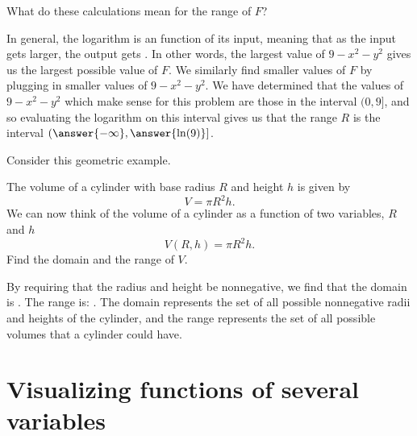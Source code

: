 \documentclass{ximera}
\begin{document}
\begin{question}
\begin{question}
\begin{question}
\begin{prompt}
        What do these calculations mean for the range of $F$? 
        
       
        In general, the logarithm is an
        function of its input, meaning that as the input gets larger,
        the output gets
        .  In
        other words, the largest value of $9-x^2-y^2$ gives us the
        largest possible value of $F$.  We similarly find smaller
        values of $F$ by plugging in smaller values of $9-x^2-y^2$.
        We have determined that the values of $9-x^2-y^2$ which make
        sense for this problem are those in the interval $(0, 9]$, and
  so evaluating the logarithm on this interval gives us that the range
  $R$ is the interval $\left(\answer{-\infty},\answer{\ln(9)}\right]$.
      \end{prompt}
    \end{question}
  \end{question}
\end{question}

Consider this geometric example.
\begin{example}
  The volume of a cylinder with base radius $R$ and height $h$ is
  given by
  \[
  V=\pi R^2h.
  \]
  We can now think of the volume of a cylinder as a function of two
  variables, $R$ and $h$
  \[
  V(R,h) = \pi R^2h.
  \]
  Find the domain and the range of $V$.
  \begin{explanation}
    By requiring that the radius and height be nonnegative, we find that the domain is
    \wordChoice{
      \choice{$\R$}
      \choice{$[0,\infty)$}
      \choice[correct]{Points $(R,h)$ in $\R^2$ where $R \geq 0$ and $h \geq 0$, or in set notation $\{ (R,h) \in \R^2 : R \geq 0, h \geq 0\}$}
      }. 
The range is:
\wordChoice{
  \choice{$\R$}
  \choice[correct]{$[0,\infty)$}
  \choice{$\{ (R,h) \in \R^2 : R \geq 0, h \geq 0\}$}
  }.
The domain represents the set of all possible nonnegative radii and heights of the cylinder, and the range represents the set of all possible volumes that a cylinder could have.
  \end{explanation}
\end{example}



\section{Visualizing functions of several variables}
\end{document}

